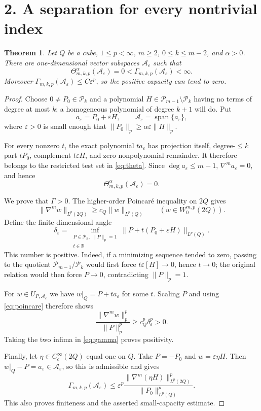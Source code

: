 \documentclass[10pt,a4paper]{article}
\newtheorem{theorem}{Theorem}
\newcommand{\R}{\mathbb R}
\newcommand{\cP}{\mathcal P}
\newcommand{\cA}{\mathcal A}
\newcommand{\norm}[1]{\lVert #1\rVert}
\begin{document}
\section*{2. A separation for every nontrivial index}

\begin{theorem}\label{thm:general}
Let $Q$ be a cube, $1\le p<\infty$, $m\ge2$, $0\le k\le m-2$, and
$\alpha>0$.  There are one-dimensional vector subspaces $\cA_\varepsilon$
such that
\[
 \Theta_{m,k,p}^{\alpha}(\cA_\varepsilon)=0
 <\Gamma_{m,k,p}(\cA_\varepsilon)<\infty.
\]
Moreover $\Gamma_{m,k,p}(\cA_\varepsilon)\le C\varepsilon^p$, so the
positive capacity can tend to zero.
\end{theorem}

\begin{proof}
Choose $0\ne P_0\in\cP_k$ and a polynomial
$H\in\cP_{m-1}\setminus\cP_k$ having no terms of degree at most $k$; a
homogeneous polynomial of degree $k+1$ will do.  Put
\[
 a_\varepsilon=P_0+\varepsilon H,
 \qquad \cA_\varepsilon=\operatorname{span}\{a_\varepsilon\},
\]
where $\varepsilon>0$ is small enough that
$\norm{P_0}_p\ge\alpha\varepsilon\norm H_p$.

For every nonzero $t$, the exact polynomial $t a_\varepsilon$ has projection
itself, degree-$\le k$ part $tP_0$, complement $t\varepsilon H$, and zero
nonpolynomial remainder.  It therefore belongs to the restricted test set in
\eqref{eq:theta}.  Since $\deg a_\varepsilon\le m-1$,
$\nabla^m a_\varepsilon=0$, and hence
\[
 \Theta_{m,k,p}^{\alpha}(\cA_\varepsilon)=0.
\]

We prove that $\Gamma>0$.  The higher-order Poincaré inequality on $2Q$
gives
\begin{equation}\label{eq:poincare}
 \norm{\nabla^m w}_{L^p(2Q)}\ge c_Q\norm w_{L^p(Q)}
 \qquad(w\in W_0^{m,p}(2Q)).
\end{equation}
Define the finite-dimensional angle
\[
 \delta_\varepsilon=
 \inf_{\substack{P\in\cP_k,\ \norm P_p=1\\t\in\R}}
 \norm{P+t(P_0+\varepsilon H)}_{L^p(Q)}.
\]
This number is positive.  Indeed, if a minimizing sequence tended to zero,
passing to the quotient $\cP_{m-1}/\cP_k$ would first force
$t\varepsilon[H]\to0$, hence $t\to0$; the original relation would then force
$P\to0$, contradicting $\norm P_p=1$.

For $w\in U_{P,\cA_\varepsilon}$ we have
$w|_Q=P+t a_\varepsilon$ for some $t$.  Scaling $P$ and using
\eqref{eq:poincare} therefore shows
\[
 \frac{\norm{\nabla^m w}_p^p}{\norm P_p^p}
 \ge c_Q^p\delta_\varepsilon^p>0.
\]
Taking the two infima in \eqref{eq:gamma} proves positivity.

Finally, let $\eta\in C_c^\infty(2Q)$ equal one on $Q$.  Take
$P=-P_0$ and $w=\varepsilon\eta H$.  Then
$w|_Q-P=a_\varepsilon\in\cA_\varepsilon$, so this is admissible and gives
\[
 \Gamma_{m,k,p}(\cA_\varepsilon)
 \le\varepsilon^p
 \frac{\norm{\nabla^m(\eta H)}_{L^p(2Q)}^p}
 {\norm{P_0}_{L^p(Q)}^p}.
\]
This also proves finiteness and the asserted small-capacity estimate.
\end{proof}
\end{document}
